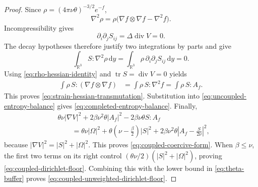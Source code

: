 \documentclass[11pt]{amsart}
\numberwithin{equation}{section}
\theoremstyle{plain}
\theoremstyle{definition}
\theoremstyle{remark}
\newcommand{\R}{\mathbb R}
\newcommand{\dd}{\,\mathrm d}
\newcommand{\diver}{\operatorname{div}}
\begin{document}
\begin{proof}
Since \(\rho=(4\pi\nu\theta)^{-3/2}e^{-f}\),
\begin{equation}\label{eq:rho-hessian-identity}
 \nabla^2\rho
 =\rho\bigl(\nabla f\otimes\nabla f-\nabla^2f\bigr).
\end{equation}
Incompressibility gives
\[
 \partial_i\partial_jS_{ij}
 =\Delta\diver V=0.
\]
The decay hypotheses therefore justify two integrations by parts and give
\[
 \int_{\R^3}S:\nabla^2\rho\dd y
 =\int_{\R^3}\rho\,\partial_i\partial_jS_{ij}\dd y=0.
\]
Using \eqref{eq:rho-hessian-identity} and
\(\operatorname{tr}S=\diver V=0\) yields
\begin{align*}
 \int\rho\,S:(\nabla f\otimes\nabla f)
 &=\int\rho\,S:\nabla^2f
 =\int\rho\,S:A_f.
\end{align*}
This proves \eqref{eq:strain-hessian-transmutation}.  Substitution into
\eqref{eq:uncoupled-entropy-balance} gives
\eqref{eq:completed-entropy-balance}.  Finally,
\begin{align*}
 &\theta\nu|\nabla V|^2+2\beta\nu^2\theta|A_f|^2
       -2\beta\nu\theta S:A_f\\
 &\qquad=\theta\nu|\Omega|^2
  +\theta\left(\nu-\frac{\beta}{2}\right)|S|^2
  +2\beta\nu^2\theta
       \left|A_f-\frac{S}{2\nu}\right|^2,
\end{align*}
because \(|\nabla V|^2=|S|^2+|\Omega|^2\).  This proves
\eqref{eq:coupled-coercive-form}.  When \(\beta\le\nu\), the first
two terms on its right control
\((\theta\nu/2)(|S|^2+|\Omega|^2)\), proving
\eqref{eq:coupled-dirichlet-floor}.  Combining this with the lower bound in
\eqref{eq:theta-buffer} proves
\eqref{eq:coupled-unweighted-dirichlet-floor}.
\end{proof}
\end{document}
